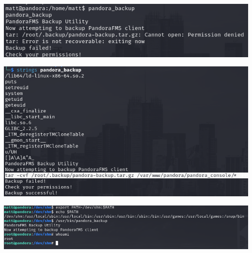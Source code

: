 \documentclass[a4paper]{article}
\begin{document}
              \begin{minipage}[c]{\textwidth}
          \centering
          \includegraphics[width=\textwidth]{src/issues/3 - PANDORA/issue31.png}
          \label{3:PANDORA:issue.md:issue31.png}
          \vspace{4ex}
        \end{minipage}
              \begin{minipage}[c]{\textwidth}
          \centering
          \includegraphics[width=\textwidth]{src/issues/3 - PANDORA/issue32.png}
          \label{3:PANDORA:issue.md:issue32.png}
          \vspace{4ex}
        \end{minipage}
              \begin{minipage}[c]{\textwidth}
          \centering
          \includegraphics[width=\textwidth]{src/issues/3 - PANDORA/issue33.png}
          \label{3:PANDORA:issue.md:issue33.png}
          \vspace{4ex}
        \end{minipage}
          
\end{document}
